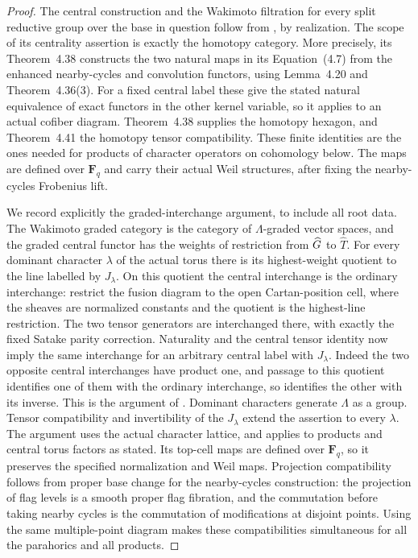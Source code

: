 \begin{proof}
The central construction and the Wakimoto filtration for every split
reductive group over the base in question follow from
\cite[Theorem~1.4 and Theorem~5.24]{CvdHS}, by realization.
The scope of its centrality assertion is exactly the homotopy
category. More precisely, its Theorem~4.38 constructs the two
natural maps in its Equation~(4.7) from the enhanced nearby-cycles
and convolution functors, using Lemma~4.20 and Theorem~4.36(3).
For a fixed central label these give the stated natural equivalence
of exact functors in the other kernel variable, so it applies to
an actual cofiber diagram. Theorem~4.38 supplies the homotopy
hexagon, and Theorem~4.41 the homotopy tensor compatibility.
These finite identities are the ones needed for products of
character operators on cohomology below. The maps are defined
over $\mathbf F_q$ and carry their actual Weil structures, after
fixing the nearby-cycles Frobenius lift.

We record explicitly the graded-interchange argument, to include all
root data. The Wakimoto graded category is the category of
$\Lambda$-graded vector spaces, and the graded central functor has
the weights of restriction from $\widehat G$ to $\widehat T$. For every
dominant character $\lambda$ of the actual torus there is its
highest-weight quotient to the line labelled by $J_\lambda$.
On this quotient the central interchange is the ordinary
interchange: restrict the fusion diagram to the open Cartan-position
cell, where the sheaves are normalized constants and the quotient
is the highest-line restriction. The two tensor generators are
interchanged there, with exactly the fixed Satake parity correction.
Naturality and the central tensor identity now imply the same
interchange for an arbitrary central label with $J_\lambda$.
Indeed the two opposite central interchanges have product one,
and passage to this quotient identifies one of them with the
ordinary interchange, so identifies the other with its inverse.
This is the argument of \cite[Lemma~18 and Section~3.6.6,
Equation~(21)]{AB}. Dominant characters generate $\Lambda$ as a
group. Tensor compatibility and invertibility of the $J_\lambda$
extend the assertion to every $\lambda$. The argument uses the
actual character lattice, and applies to products and central torus
factors as stated. Its top-cell maps are defined over $\mathbf F_q$,
so it preserves the specified normalization and Weil maps.
Projection compatibility follows from proper base change for the
nearby-cycles construction: the projection of flag levels is a
smooth proper flag fibration, and the commutation before taking
nearby cycles is the commutation of modifications at disjoint points.
Using the same multiple-point diagram makes these compatibilities
simultaneous for all the parahorics and all products.


\end{proof}
